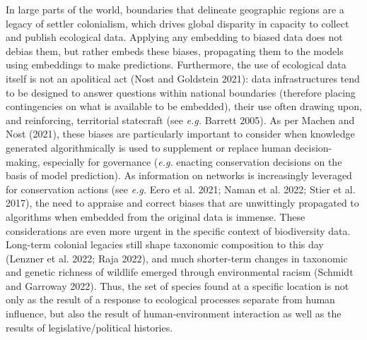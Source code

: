 \documentclass[
  letterpaper,
  DIV=11,
  numbers=noendperiod]{scrartcl}
\begin{document}
\begin{tcolorbox}[enhanced jigsaw, coltitle=black, title=\textcolor{quarto-callout-note-color}{\faInfo}\hspace{0.5em}{Box 2 - Minding legacies shaping ecological datasets}, bottomtitle=1mm, colback=white, breakable, colbacktitle=quarto-callout-note-color!10!white, opacityback=0, left=2mm, arc=.35mm, colframe=quarto-callout-note-color-frame, toptitle=1mm, leftrule=.75mm, rightrule=.15mm, titlerule=0mm, bottomrule=.15mm, toprule=.15mm, opacitybacktitle=0.6]

In large parts of the world, boundaries that delineate geographic
regions are a legacy of settler colonialism, which drives global
disparity in capacity to collect and publish ecological data. Applying
any embedding to biased data does not debias them, but rather embeds
these biases, propagating them to the models using embeddings to make
predictions. Furthermore, the use of ecological data itself is not an
apolitical act (Nost and Goldstein 2021): data infrastructures tend to
be designed to answer questions within national boundaries (therefore
placing contingencies on what is available to be embedded), their use
often drawing upon, and reinforcing, territorial statecraft (see
\emph{e.g.} Barrett 2005). As per Machen and Nost (2021), these biases
are particularly important to consider when knowledge generated
algorithmically is used to supplement or replace human decision-making,
especially for governance (\emph{e.g.} enacting conservation decisions
on the basis of model prediction). As information on networks is
increasingly leveraged for conservation actions (see \emph{e.g.} Eero et
al. 2021; Naman et al. 2022; Stier et al. 2017), the need to appraise
and correct biases that are unwittingly propagated to algorithms when
embedded from the original data is immense. These considerations are
even more urgent in the specific context of biodiversity data. Long-term
colonial legacies still shape taxonomic composition to this day (Lenzner
et al. 2022; Raja 2022), and much shorter-term changes in taxonomic and
genetic richness of wildlife emerged through environmental racism
(Schmidt and Garroway 2022). Thus, the set of species found at a
specific location is not only as the result of a response to ecological
processes separate from human influence, but also the result of
human-environment interaction as well as the results of
legislative/political histories.

\end{tcolorbox}
\end{document}
